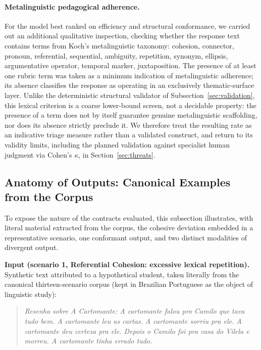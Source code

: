 \documentclass{sbc2023}%
\begin{document}
\paragraph{Metalinguistic pedagogical adherence.} For the model best ranked on efficiency and structural conformance, we carried out an additional qualitative inspection, checking whether the response text contains terms from Koch's metalinguistic taxonomy: cohesion, connector, pronoun, referential, sequential, ambiguity, repetition, synonym, ellipsis, argumentative operator, temporal marker, juxtaposition. The presence of at least one rubric term was taken as a minimum indication of metalinguistic adherence; its absence classifies the response as operating in an exclusively thematic-surface layer. Unlike the deterministic structural validator of Subsection~\ref{sec:validation}, this lexical criterion is a coarse lower-bound screen, not a decidable property: the presence of a term does not by itself guarantee genuine metalinguistic scaffolding, nor does its absence strictly preclude it. We therefore treat the resulting rate as an indicative triage measure rather than a validated construct, and return to its validity limits, including the planned validation against specialist human judgment via Cohen's $\kappa$, in Section~\ref{sec:threats}.

\subsection{Anatomy of Outputs: Canonical Examples from the Corpus}
\label{sec:anatomy}

To expose the nature of the contracts evaluated, this subsection illustrates, with literal material extracted from the corpus, the cohesive deviation embedded in a representative scenario, one conformant output, and two distinct modalities of divergent output.

\textbf{Input (scenario 1, Referential Cohesion: excessive lexical repetition).} Synthetic text attributed to a hypothetical student, taken literally from the canonical thirteen-scenario corpus (kept in Brazilian Portuguese as the object of linguistic study):

\begin{quotation}
\textit{Resenha sobre A Cartomante: A cartomante falou pro Camilo que tava tudo bem. A cartomante leu as cartas. A cartomante sorriu pra ele. A cartomante deu certeza pra ele. Depois o Camilo foi pra casa do Vilela e morreu. A cartomante tinha errado tudo.}
\end{quotation}
\end{document}
